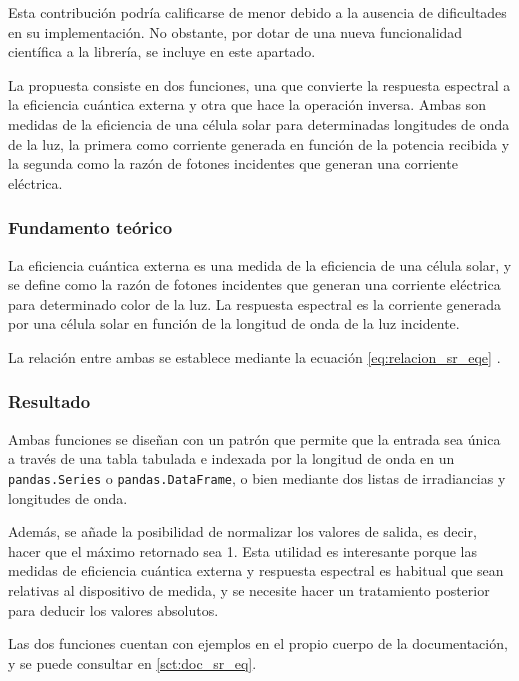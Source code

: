 Esta contribución podría calificarse de menor debido a la ausencia de dificultades en su implementación. No obstante, por dotar de una nueva funcionalidad científica a la librería, se incluye en este apartado.

La propuesta consiste en dos funciones, una que convierte la \gls{respuesta espectral} a la \gls{eficiencia cuántica externa} y otra que hace la operación inversa. Ambas son medidas de la eficiencia de una \gls{célula solar} para determinadas longitudes de onda de la luz, la primera como corriente generada en función de la potencia recibida y la segunda como la razón de fotones incidentes que generan una corriente eléctrica.

\subsubsection{Fundamento teórico}

La eficiencia cuántica externa es una medida de la eficiencia de una célula solar, y se define como la razón de fotones incidentes que generan una corriente eléctrica para determinado color de la luz. La respuesta espectral es la corriente generada por una célula solar en función de la \gls{longitud de onda} de la luz incidente.

La relación entre ambas se establece mediante la ecuación \ref{eq:relacion_sr_eqe} \cite[pp. 15-16, Eq. ]{Markvart2012-un}.

\subsubsection{Resultado}

Ambas funciones se diseñan con un patrón que permite que la entrada sea única a través de una \gls{tabla tabulada e indexada} por la \gls{longitud de onda} en un \texttt{pandas.Series} o \texttt{pandas.DataFrame}, o bien mediante dos listas de irradiancias y longitudes de onda.

Además, se añade la posibilidad de normalizar los valores de salida, es decir, hacer que el máximo retornado sea 1. Esta utilidad es interesante porque las medidas de eficiencia cuántica externa y respuesta espectral es habitual que sean relativas al dispositivo de medida, y se necesite hacer un tratamiento posterior para deducir los valores absolutos.

Las dos funciones cuentan con ejemplos en el propio cuerpo de la documentación, y se puede consultar en \ref{sct:doc_sr_eq}.

